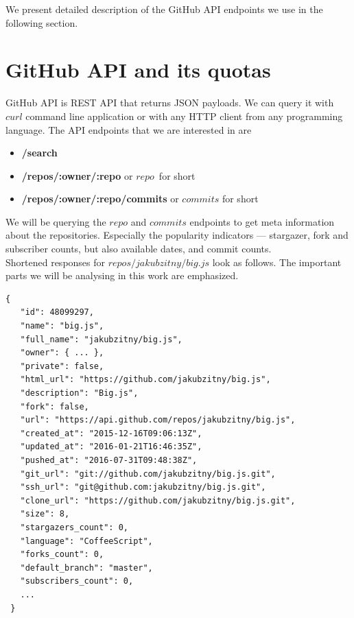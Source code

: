 \documentclass[thesis=M,english]{FITthesis}[2012/10/20]
\begin{document}
We present detailed description of the GitHub API endpoints we use in the following section. \\

\section{GitHub API and its quotas}

GitHub API is REST API that returns JSON payloads. We can query it with $curl$ command line application or with any HTTP client from any programming language. The API endpoints that we are interested in are \\

\begin{itemize}
\item \textbf{/search} 
\item \textbf{/repos/:owner/:repo} or $repo$ for short
\item \textbf{/repos/:owner/:repo/commits} or $commits$ for short
\end{itemize}

We will be querying the $repo$ and $commits$ endpoints to get meta information about the repositories. Especially the popularity indicators — stargazer, fork and subscriber counts, but also available dates, and commit counts. \\

Shortened responses for $repos/jakubzitny/big.js$ look as follows. The important parts we will be analysing in this work are emphasized. \\

\lstset{title=GitHub API response from /repos/jakubzitny/big.js endpoint}
\begin{lstlisting}[basicstyle=\tiny]
 {
   "id": 48099297,
   "name": "big.js",
   "full_name": "jakubzitny/big.js",
   "owner": { ... },
   "private": false,
   "html_url": "https://github.com/jakubzitny/big.js",
   "description": "Big.js",
   "fork": false,
   "url": "https://api.github.com/repos/jakubzitny/big.js",
   "created_at": "2015-12-16T09:06:13Z",
   "updated_at": "2016-01-21T16:46:35Z",
   "pushed_at": "2016-07-31T09:48:38Z",
   "git_url": "git://github.com/jakubzitny/big.js.git",
   "ssh_url": "git@github.com:jakubzitny/big.js.git",
   "clone_url": "https://github.com/jakubzitny/big.js.git",
   "size": 8,
   "stargazers_count": 0,
   "language": "CoffeeScript",
   "forks_count": 0,
   "default_branch": "master",
   "subscribers_count": 0,
   ...
 }
\end{lstlisting}
\end{document}
